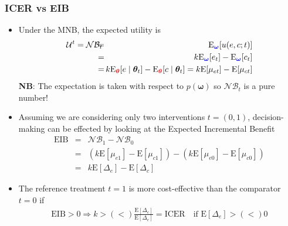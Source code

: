 \begin{frame}[label={EIB_def}]
\frametitle{ICER vs EIB}
\begin{itemize}
\item Under the MNB, the expected utility is \myblue
\begin{eqnarray*} 
\mathcal{U}^t = \mathcal{NB}_t &\!\!\!\!\!=\!\!\!\!\!& \mbox{E}{\color{blue}_{\bm\omega}}[u(e,c;t)] \\
&\!\!\!\!\!=\!\!\!\!\!& k\mbox{E}{\color{blue}_{\bm\omega}}[e_t] - \mbox{E}{\color{blue}_{\bm\omega}}[c_t] \\
&\!\!\!\!\!=\!\!\!\!\!& k\mbox{E}{\color{red}_{\bm\theta}}[e\mid \bm\theta_t]-\mbox{E}{\color{red}_{\bm\theta}}[c\mid\bm\theta_t] =  k\mbox{E}[\mu_{et}]-\mbox{E}[\mu_{ct}]
\end{eqnarray*}\black 
\textbf{NB}: The expectation is taken with respect to $p(\bm\omega)$ so $\mathcal{NB}_t$ is a pure number!

\vspace{10pt}\pause
\item Assuming we are considering only two interventions $t=(0,1)$, decision-making can be effected by looking at the \alert{Expected Incremental Benefit} \myblue
\begin{eqnarray*}
\mbox{EIB} & = & \mathcal{NB}_1-\mathcal{NB}_0 \\
& = & \left(k\mbox{E}[\mu_{e1}]-\mbox{E}[\mu_{c1}]\right) - \left(k\mbox{E}[\mu_{e0}]-\mbox{E}[\mu_{c0}]\right)\\
&=& k\mbox{E}[\Delta_e] - \mbox{E}[\Delta_c]
\end{eqnarray*}\black 

\pause\vspace{-5pt}
\item The reference treatment $t=1$ is more cost-effective than the comparator $t=0$ if \myblue
\begin{eqnarray*}
\mbox{EIB}>0 \Rightarrow k>(<)\frac{\mbox{E}[\Delta_c]}{\mbox{E}[\Delta_e]} = \mbox{ICER} \quad \mbox{if $\mbox{E}[\Delta_e]>(<)0$}
\end{eqnarray*}
\end{itemize}
\end{frame}

